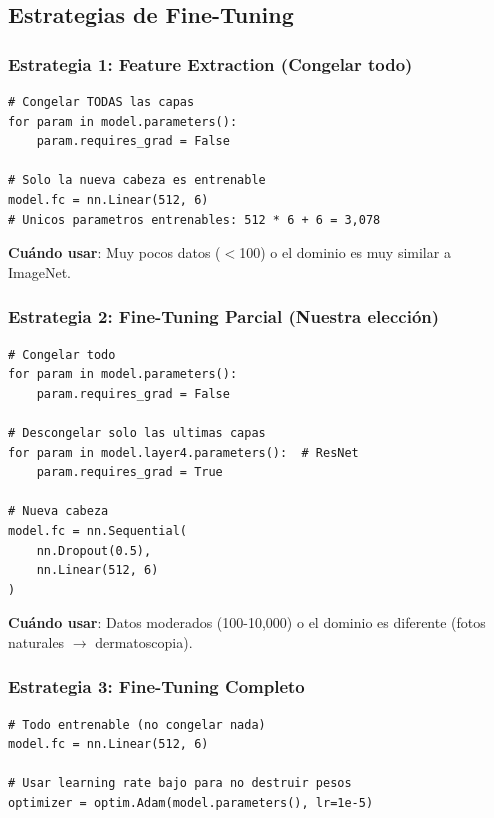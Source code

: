 \documentclass[12pt,a4paper]{article}
\begin{document}
\subsection{Estrategias de Fine-Tuning}

\subsubsection{Estrategia 1: Feature Extraction (Congelar todo)}

\begin{lstlisting}[caption={Feature extraction: solo entrenar la cabeza}]
# Congelar TODAS las capas
for param in model.parameters():
    param.requires_grad = False

# Solo la nueva cabeza es entrenable
model.fc = nn.Linear(512, 6)
# Unicos parametros entrenables: 512 * 6 + 6 = 3,078
\end{lstlisting}

\textbf{Cuándo usar}: Muy pocos datos ($<$100) o el dominio es muy similar a ImageNet.

\subsubsection{Estrategia 2: Fine-Tuning Parcial (Nuestra elección)}

\begin{lstlisting}[caption={Fine-tuning parcial: descongelar últimas capas}]
# Congelar todo
for param in model.parameters():
    param.requires_grad = False

# Descongelar solo las ultimas capas
for param in model.layer4.parameters():  # ResNet
    param.requires_grad = True

# Nueva cabeza
model.fc = nn.Sequential(
    nn.Dropout(0.5),
    nn.Linear(512, 6)
)
\end{lstlisting}

\textbf{Cuándo usar}: Datos moderados (100-10,000) o el dominio es diferente (fotos naturales $\rightarrow$ dermatoscopia).

\subsubsection{Estrategia 3: Fine-Tuning Completo}

\begin{lstlisting}[caption={Fine-tuning completo: todo entrenable}]
# Todo entrenable (no congelar nada)
model.fc = nn.Linear(512, 6)

# Usar learning rate bajo para no destruir pesos
optimizer = optim.Adam(model.parameters(), lr=1e-5)
\end{lstlisting}
\end{document}
